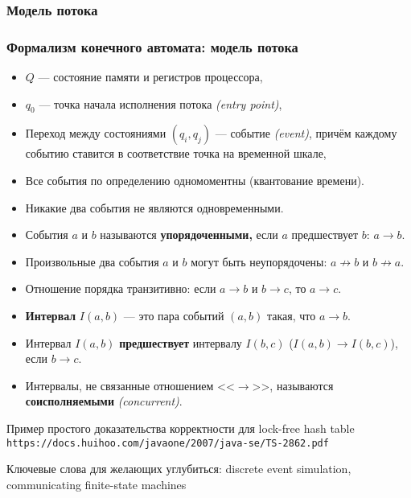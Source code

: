 \documentclass[aspectratio=169, pdf, 8pt, unicode]{beamer}
\begin{document}
\begin{frame}[fragile]
\frametitle{Модель потока}
\frametitle{Формализм конечного автомата: модель потока}
\begin{itemize}
    \item $Q$ --- состояние памяти и регистров процессора,
    \item $q_0$ --- точка начала исполнения потока \textit{(entry point)},
    \item Переход между состояниями $(q_i, q_j)$ --- событие \textit{(event)},
        причём каждому событию ставится в соответствие точка на временной шкале,
    \item Все события по определению одномоментны (квантование времени).
    \item Никакие два события не являются одновременными.
    \item События $a$ и $b$ называются \textbf{упорядоченными,} если $a$ предшествует $b$: $a \to b$.
    \item Произвольные два события $a$ и $b$ могут быть неупорядочены: $a \not\to b$ и $b \not\to a$.
    \item Отношение порядка транзитивно: если $a \to b$ и $b \to c$, то $a \to c$.
    \item \textbf{Интервал} $I(a,b)$ --- это пара событий $(a, b)$ такая, что $a \to b$.\\
    \item Интервал $I(a,b)$ \textbf{предшествует} интервалу $I(b, c)$ ($I(a,b) \to I(b,c)$), если $b \to c$.
    \item Интервалы, не связанные отношением <<$\to$>>, называются \textbf{соисполняемыми} \textit{(concurrent)}.
\end{itemize}

Пример простого доказательства корректности для lock-free hash table\\
\texttt{https://docs.huihoo.com/javaone/2007/java-se/TS-2862.pdf}

Ключевые слова для желающих углубиться: discrete event simulation, communicating finite-state machines
\end{frame}
\end{document}

